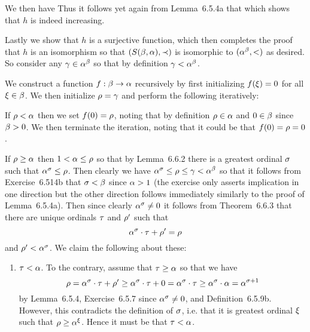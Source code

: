 {{    We then have
    Thus it follows yet again from Lemma~6.5.4a that
    which shows that $h$ is indeed increasing.

    Lastly we show that $h$ is a surjective function, which then completes the proof that $h$ is an isomorphism so that $(S(\beta,\alpha), \prec)$ is isomorphic to $(\alpha^\beta, <)$ as desired.
    So consider any $\gamma \in \alpha^\beta$ so that by definition $\gamma < \alpha^\beta$.
    
    We construct a function $f: \beta \to \alpha$ recursively by first initializing $f(\xi) = 0$ for all $\xi \in \beta$.
    We then initialize $\rho = \gamma$ and perform the following iteratively:

    If $\rho < \alpha$ then we set $f(0) = \rho$, noting that by definition $\rho \in \alpha$ and $0 \in \beta$ since $\beta > 0$.
    We then terminate the iteration, noting that it could be that $f(0) = \rho = 0$. 

    If $\rho \geq \alpha$ then $1 < \alpha \leq \rho$ so that by Lemma~6.6.2 there is a greatest ordinal $\sigma$ such that $\alpha^\sigma \leq \rho$.
    Then clearly we have $\alpha^\sigma \leq \rho \leq \gamma < \alpha^\beta$ so that it follows from Exercise~6.514b that $\sigma < \beta$ since $\alpha > 1$ (the exercise only asserts implication in one direction but the other direction follows immediately similarly to the proof of Lemma~6.5.4a).
    Then since clearly $\alpha^\sigma \neq 0$ it follows from Theorem~6.6.3 that there are unique ordinals $\tau$ and $\rho'$ such that
    $$
    \alpha^\sigma \cdot \tau + \rho' = \rho
    $$
    and $\rho' < \alpha^\sigma$.
    We claim the following about these:
    \begin{enumerate}
    \item $\tau < \alpha$.
      To the contrary, assume that $\tau \geq \alpha$ so that we have
      $$
      \rho = \alpha^\sigma \cdot \tau + \rho' \geq \alpha^\sigma \cdot \tau + 0 = \alpha^\sigma \cdot \tau \geq \alpha^\sigma \cdot \alpha = \alpha^{\sigma + 1}
      $$
      by Lemma~6.5.4, Exercise~6.5.7 since $\alpha^\sigma \neq 0$, and Definition~6.5.9b.
      However, this contradicts the definition of $\sigma$, i.e. that it is greatest ordinal $\xi$ such that $\rho \geq \alpha^\xi$.
      Hence it must be that $\tau < \alpha$.


\end{enumerate}}}
